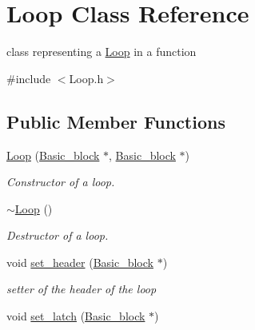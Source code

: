 \hypertarget{class_loop}{}\section{Loop Class Reference}
\label{class_loop}


class representing a \mbox{\hyperlink{class_loop}{Loop}} in a function  




{\ttfamily \#include $<$Loop.\+h$>$}

\subsection*{Public Member Functions}
\begin{DoxyCompactItemize}
\item 
\mbox{\label{class_loop_a297fba15fcc47b206b5ffc204d1bd73c}} 
\mbox{\hyperlink{class_loop_a297fba15fcc47b206b5ffc204d1bd73c}{Loop}} (\mbox{\hyperlink{class_basic__block}{Basic\+\_\+block}} $\ast$, \mbox{\hyperlink{class_basic__block}{Basic\+\_\+block}} $\ast$)
\begin{DoxyCompactList}\small\item\em Constructor of a loop. \end{DoxyCompactList}\item 
\mbox{\label{class_loop_ac25ba52a46e689c85e2720718615d767}} 
\mbox{\hyperlink{class_loop_ac25ba52a46e689c85e2720718615d767}{$\sim$\+Loop}} ()
\begin{DoxyCompactList}\small\item\em Destructor of a loop. \end{DoxyCompactList}\item 
\mbox{\label{class_loop_a7c12f75026535ed0ed793d945cca5b26}} 
void \mbox{\hyperlink{class_loop_a7c12f75026535ed0ed793d945cca5b26}{set\+\_\+header}} (\mbox{\hyperlink{class_basic__block}{Basic\+\_\+block}} $\ast$)
\begin{DoxyCompactList}\small\item\em setter of the header of the loop \end{DoxyCompactList}\item 
\mbox{\label{class_loop_ab5523a4e9881844ed445c18c809752cb}} 
void \mbox{\hyperlink{class_loop_ab5523a4e9881844ed445c18c809752cb}{set\+\_\+latch}} (\mbox{\hyperlink{class_basic__block}{Basic\+\_\+block}} $\ast$)

\end{DoxyCompactItemize}
